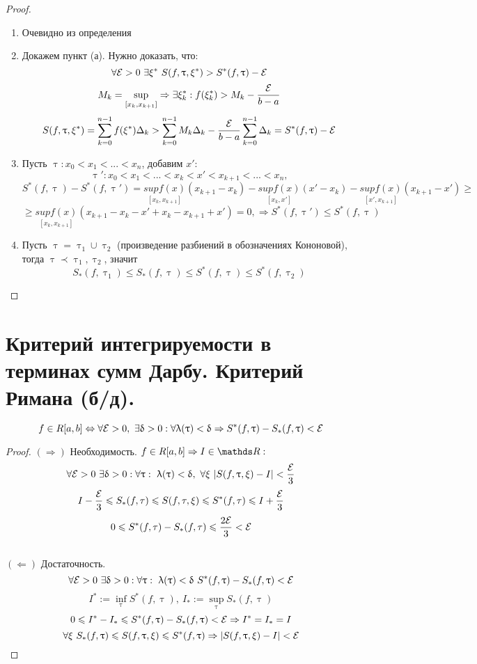\documentclass[matan]{subfiles}
\begin{document}
  \begin{proof}
      \begin{enumerate}
          \item Очевидно из определения
          \item Докажем пункт (а). Нужно доказать, что:
          $$\forall \mathcal{E} > 0\ \exists \xi^* \ S(f, \uptau, \xi^*) > S^* (f, \uptau) - \mathcal{E}$$
          $$M_k=\sup\limits_{[x_k,x_{k+1}]} \Rightarrow \exists \xi_k^*: f(\xi_k^*) > M_k - \frac{\mathcal{E}}{b-a}$$
          $$S(f, \uptau, \xi^*)=\sum\limits_{k=0}^{n-1} f(\xi^*) \Delta_k > \sum\limits_{k=0}^{n-1} M_k \Delta_k - \frac{\mathcal{E}}{b-a} \sum\limits_{k=0}^{n-1} \Delta_k = S^*(f, \uptau)-\mathcal{E}$$
          \item Пусть $\uptau: x_0<x_1<...<x_n$, добавим $x'$:
          $$\uptau': x_0<x_1<...<x_k<x'<x_{k+1}<...<x_n,$$
          $$S^*(f,\uptau)-S^*(f,\uptau')=\underset{[x_k,x_{k+1}]}{sup f(x)}(x_{k+1}-x_k) - \underset{[x_k,x']}{sup f(x)}(x'-x_k) - \underset{[x',x_{k+1}]}{sup f(x)} (x_{k+1}-x') \geqslant$$ $$\geqslant \underset{[x_k,x_{k+1}]}{sup f(x)} (x_{k+1}-x_k-x'+x_k-x_{k+1}+x') = 0, \Rightarrow S^*(f, \uptau') \leqslant S^*(f, \uptau)$$
          \item Пусть $\uptau = \uptau_1 \cup \uptau_2$ (произведение разбиений в обозначениях Кононовой), тогда $\uptau \prec \uptau_1, \uptau_2$, значит
          $$S_*(f, \uptau_1) \leqslant S_*(f, \uptau) \leqslant S^*(f, \uptau) \leqslant S^*(f, \uptau_2)$$
      \end{enumerate}
  \end{proof}

  \newpage
  \section{Критерий интегрируемости в терминах сумм Дарбу. Критерий Римана (б/д).}

  \begin{Theorem} 
      \[f \in R[a,b] \Leftrightarrow \forall \mathcal{E} > 0,\ \exists \updelta > 0: \forall \uplambda(\uptau) < \updelta \Rightarrow S^*(f, \uptau)-S_*(f, \uptau)<\mathcal{E}\]
  \end{Theorem}

  \begin{proof}
      $(\Rightarrow)$ Необходимость. $f \in R[a,b] \Rightarrow I \in \R:$
      $$\forall \mathcal{E} > 0\ \exists \updelta > 0: \forall \uptau: \ \uplambda(\uptau) < \updelta,\ \forall \xi \ |S(f, \uptau, \xi) - I| < \frac{\mathcal{E}}{3}$$
      $$I-\frac{\mathcal{E}}{3} \leqslant S_*(f, \tau) \leqslant  S(f, \tau, \xi) \leqslant S^*(f, \tau) \leqslant  I+\frac{\mathcal{E}}{3}$$
      $$0 \leqslant S^*(f, \tau) - S_*(f, \tau) \leqslant \frac{2 \mathcal{E}}{3} < \mathcal{E}$$
      \\
      $(\Leftarrow)$ Достаточность.
      $$\forall \E > 0\ \e \updelta > 0: \forall \uptau: \ \uplambda(\uptau) < \updelta\ S^*(f, \uptau)-S_*(f,\uptau) < \E$$
      $$I^*:=\inf\limits_\uptau S^*(f, \uptau), \ I_*:=\sup\limits_\uptau S_* (f, \uptau)$$
      $$0 \leqslant I^* - I_* \leqslant S^*(f, \uptau) - S_*(f, \uptau) < \mathcal{E} \Rightarrow I^*=I_*=I$$
      $$\forall \xi \ S_*(f, \uptau) \leqslant S(f, \uptau, \xi) \leqslant S^*(f, \uptau) \Rightarrow |S(f, \uptau, \xi) - I| < \mathcal{E}$$
  \end{proof}
\end{document}
